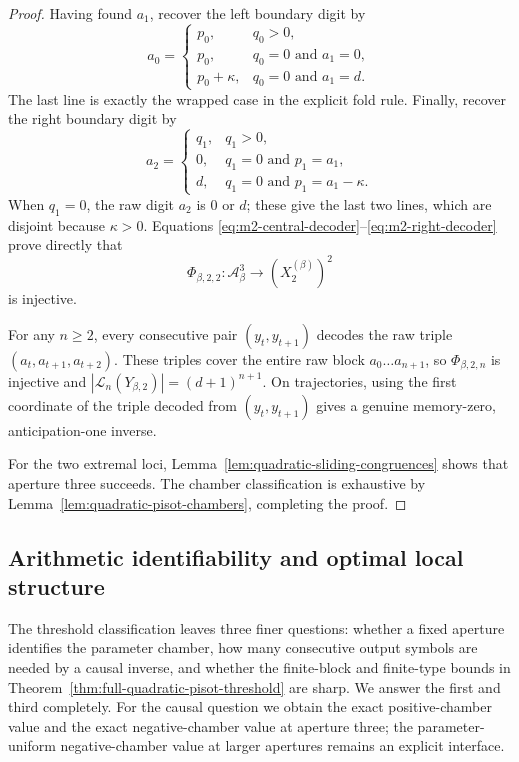 \begin{proof}
Having found $a_1$, recover the left boundary digit by
\begin{equation}
a_0=
\begin{cases}
p_0,&q_0>0,\\
p_0,&q_0=0\text{ and }a_1=0,\\
p_0+\kappa,&q_0=0\text{ and }a_1=d.
\end{cases}
\label{eq:m2-left-decoder}
\end{equation}
The last line is exactly the wrapped case in the explicit fold rule.  Finally,
recover the right boundary digit by
\begin{equation}
a_2=
\begin{cases}
q_1,&q_1>0,\\
0,&q_1=0\text{ and }p_1=a_1,\\
d,&q_1=0\text{ and }p_1=a_1-\kappa.
\end{cases}
\label{eq:m2-right-decoder}
\end{equation}
When $q_1=0$, the raw digit $a_2$ is $0$ or $d$; these give the last two
lines, which are disjoint because $\kappa>0$.  Equations
\eqref{eq:m2-central-decoder}--\eqref{eq:m2-right-decoder} prove directly that
\[
\Phi_{\beta,2,2}:\mathcal A_\beta^3
\longrightarrow (X_2^{(\beta)})^2
\]
is injective.

For any $n\ge2$, every consecutive pair $(y_t,y_{t+1})$ decodes the raw
triple $(a_t,a_{t+1},a_{t+2})$.  These triples cover the entire raw block
$a_0\ldots a_{n+1}$, so $\Phi_{\beta,2,n}$ is injective and
$|\mathcal L_n(Y_{\beta,2})|=(d+1)^{n+1}$.  On trajectories, using the first
coordinate of the triple decoded from $(y_t,y_{t+1})$ gives a genuine
memory-zero, anticipation-one inverse.

For the two extremal loci, Lemma~\ref{lem:quadratic-sliding-congruences} shows
that aperture three succeeds.  The chamber classification is exhaustive by
Lemma~\ref{lem:quadratic-pisot-chambers}, completing the proof.
\end{proof}

\subsection{Arithmetic identifiability and optimal local structure}

The threshold classification leaves three finer questions: whether a fixed
aperture identifies the parameter chamber, how many consecutive output
symbols are needed by a causal inverse, and whether the finite-block and
finite-type bounds in Theorem~\ref{thm:full-quadratic-pisot-threshold} are
sharp.  We answer the first and third completely.  For the causal question we
obtain the exact positive-chamber value and the exact negative-chamber value
at aperture three; the parameter-uniform negative-chamber value at larger
apertures remains an explicit interface.

